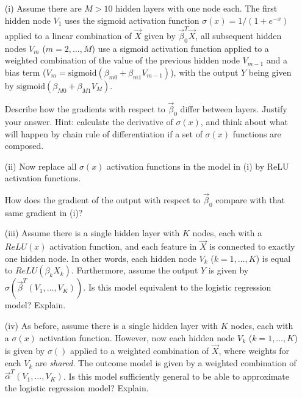 \documentclass[11pt]{article}
\begin{document}
\begin{itemize}

\item[(i)] Assume there are $M>10$ hidden layers with one node each.  The first hidden node $V_1$ uses the sigmoid activation function $\sigma(x) = 1/(1 + e^{-x})$ applied to a linear combination of $\vec{X}$ given by $\vec{\beta}_0^T \vec{X}$, all subsequent hidden nodes $V_m$ ($m = 2, \ldots, M$) use a sigmoid activation function applied to a weighted combination of the value of the previous hidden node $V_{m-1}$ and a bias term ($V_m = \text{sigmoid}(\beta_{m0} + \beta_{m1} V_{m-1})$), with the output $Y$ being given by $\text{sigmoid}(\beta_{M0} + \beta_{M1} V_M)$.

Describe how the gradients with respect to $\vec{\beta}_0$ differ between layers. Justify your answer.
Hint: calculate the derivative of $\sigma(x)$, and think about what will happen by chain rule of differentiation if a set of $\sigma(x)$ functions are composed.

\item[(ii)] Now replace all $\sigma(x)$ activation functions in the model in (i) by ReLU activation functions. 

How does the gradient of the output with respect to $\vec{\beta}_0$ compare with that same gradient in (i)?

\item[(iii)] Assume there is a single hidden layer with $K$ nodes, each with a $ReLU(x)$ activation function, and each feature in $\vec{X}$ is connected to exactly one hidden node.  In other words, each hidden node $V_k$ ($k = 1, \ldots, K$) is equal to $ReLU(\beta_k X_k)$.  Furthermore, assume the output $Y$ is given by $\sigma(\vec{\beta}^T (V_1, \ldots, V_K))$.  Is this model equivalent to the logistic regression model?  Explain.

\item[(iv)] As before, assume there is a single hidden layer with $K$ nodes, each with a $\sigma(x)$ activation function.  However, now each hidden node $V_k$ ($k = 1, \ldots, K$) is given by
$\sigma()$ applied to a weighted combination of $\vec{X}$, where weights for each $V_k$ are \emph{shared}.  The outcome model is given by a weighted combination of $\vec{\alpha}^T (V_1, \ldots, V_K)$.  Is this model sufficiently general to be able to approximate the logistic regression model?  Explain.

\end{itemize}


\end{document}
